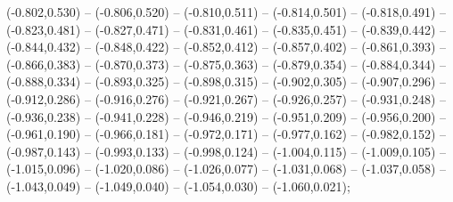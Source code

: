 (-0.802,0.530) -- (-0.806,0.520) -- (-0.810,0.511) -- (-0.814,0.501) -- (-0.818,0.491) -- (-0.823,0.481) -- (-0.827,0.471) -- (-0.831,0.461) -- (-0.835,0.451) -- (-0.839,0.442) -- (-0.844,0.432) -- (-0.848,0.422) -- (-0.852,0.412) -- (-0.857,0.402) -- (-0.861,0.393) -- (-0.866,0.383) -- (-0.870,0.373) -- (-0.875,0.363) -- (-0.879,0.354) -- (-0.884,0.344) -- (-0.888,0.334) -- (-0.893,0.325) -- (-0.898,0.315) -- (-0.902,0.305) -- (-0.907,0.296) -- (-0.912,0.286) -- (-0.916,0.276) -- (-0.921,0.267) -- (-0.926,0.257) -- (-0.931,0.248) -- (-0.936,0.238) -- (-0.941,0.228) -- (-0.946,0.219) -- (-0.951,0.209) -- (-0.956,0.200) -- (-0.961,0.190) -- (-0.966,0.181) -- (-0.972,0.171) -- (-0.977,0.162) -- (-0.982,0.152) -- (-0.987,0.143) -- (-0.993,0.133) -- (-0.998,0.124) -- (-1.004,0.115) -- (-1.009,0.105) -- (-1.015,0.096) -- (-1.020,0.086) -- (-1.026,0.077) -- (-1.031,0.068) -- (-1.037,0.058) -- (-1.043,0.049) -- (-1.049,0.040) -- (-1.054,0.030) -- (-1.060,0.021);
